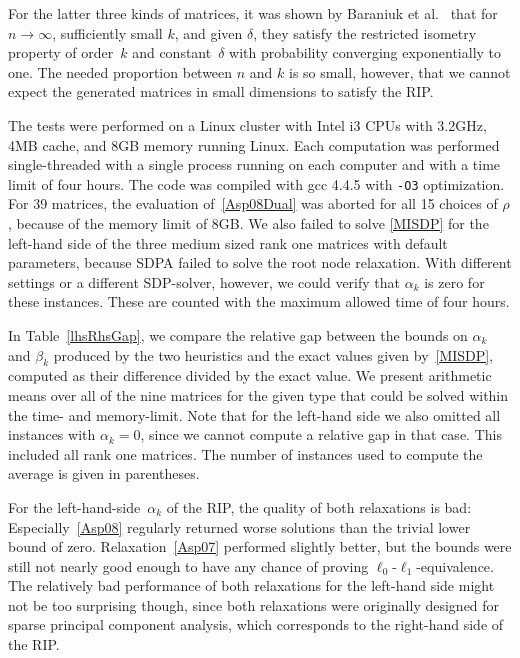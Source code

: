 \documentclass[journal]{IEEEtran}
\begin{document}
For the latter three kinds of matrices, it was shown by Baraniuk et al.~\cite{BDDW08} that for $n \rightarrow \infty$, 
sufficiently small $k$, and given $\delta$, they satisfy the restricted
isometry property of order~$k$ and constant~$\delta$
with probability converging exponentially to one. The needed proportion between $n$ and $k$ is so small, however,
that we cannot expect the generated matrices in small dimensions to satisfy the RIP.

The tests were performed on a Linux cluster with Intel i3 CPUs with 3.2GHz, 4MB cache, and 8GB memory running
Linux. Each computation was performed single-threaded with a single process running on each computer and with 
a time limit of four hours. The code was compiled with gcc 4.4.5 with \texttt{-O3} optimization. For 39 matrices, 
the evaluation of~\eqref{Asp08Dual} was aborted for all 15 choices of $\rho$, because of the memory limit of 8GB.
We also failed to solve \eqref{MISDP} for the left-hand side of the three medium sized rank one matrices with default
parameters, because SDPA failed to solve the root node relaxation. With different settings or a different
SDP-solver, however, we could verify that $\alpha_k$ is zero for these instances.
These are counted with the maximum allowed time of four hours. 

In Table~\ref{lhsRhsGap}, we compare the relative gap between the bounds on $\alpha_k$ and $\beta_k$ produced by the two heuristics
and the exact values given by~\eqref{MISDP}, computed as their difference divided by the exact value. We present arithmetic means over all of the nine matrices for the given type that
could be solved within the time- and memory-limit. Note that for the left-hand side we also omitted all instances with $\alpha_k=0$, 
since we cannot compute a relative gap in that case. This included all rank one matrices. The number of instances used to compute the
average is given in parentheses.

For the left-hand-side~$\alpha_k$ of the RIP, the quality of both
relaxations is bad: Especially~\eqref{Asp08} regularly returned worse solutions than the
trivial lower bound of zero. Relaxation~\eqref{Asp07} performed slightly better, but the bounds
were still not nearly good enough to have any chance of proving $\ell_0$-$\ell_1$-equivalence. The relatively
bad performance of both relaxations for the left-hand side might not be too surprising though, since both relaxations
were originally designed for sparse principal component analysis, which corresponds to the right-hand side
of the RIP.
\end{document}
